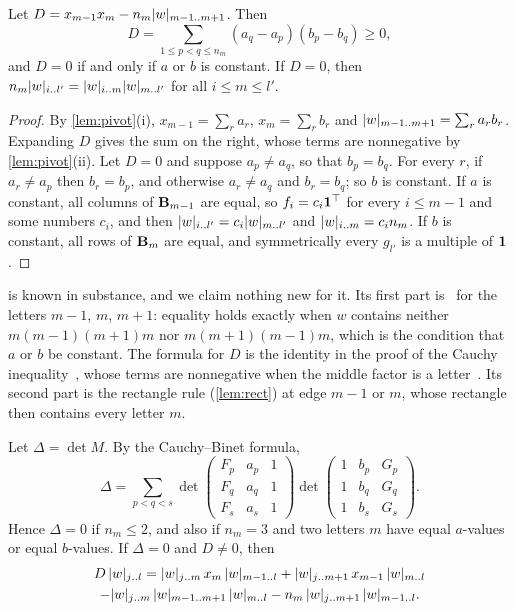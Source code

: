 \documentclass[11pt,a4paper]{article}
\begin{document}
\begin{lemma}\label{lem:letterrect}
Let $D=x_{m-1}x_m-n_m\lvert w\rvert_{m-1\mathinner{\ldotp\ldotp} m+1}$. Then
\[
D=\sum_{1\le p<q\le n_m}(a_q-a_p)(b_p-b_q)\ge0,
\]
and $D=0$ if and only if $a$ or $b$ is constant. If $D=0$, then $n_m\lvert w\rvert_{i\mathinner{\ldotp\ldotp} l'}=\lvert w\rvert_{i\mathinner{\ldotp\ldotp} m}\lvert w\rvert_{m\mathinner{\ldotp\ldotp} l'}$ for all $i\le m\le l'$.
\end{lemma}

\begin{proof}
By \cref{lem:pivot}(i), $x_{m-1}=\sum_ra_r$, $x_m=\sum_rb_r$ and $\lvert w\rvert_{m-1\mathinner{\ldotp\ldotp} m+1}=\sum_ra_rb_r$. Expanding $D$ gives the sum on the right, whose terms are nonnegative by \cref{lem:pivot}(ii). Let $D=0$ and suppose $a_p\ne a_q$, so that $b_p=b_q$. For every $r$, if $a_r\ne a_p$ then $b_r=b_p$, and otherwise $a_r\ne a_q$ and $b_r=b_q$; so $b$ is constant. If $a$ is constant, all columns of $\mathbf{B}_{m-1}$ are equal, so $f_i=c_i\mathbf{1}^{\top}$ for every $i\le m-1$ and some numbers $c_i$, and then $\lvert w\rvert_{i\mathinner{\ldotp\ldotp} l'}=c_i\lvert w\rvert_{m\mathinner{\ldotp\ldotp} l'}$ and $\lvert w\rvert_{i\mathinner{\ldotp\ldotp} m}=c_in_m$. If $b$ is constant, all rows of $\mathbf{B}_{m}$ are equal, and symmetrically every $g_{l'}$ is a multiple of $\mathbf{1}$.
\end{proof}

\begin{remark}\label{rem:letterrect}
 is known in substance, and we claim nothing new for it. Its first part is~\cite[Lemma~2, p.~12]{MSY04} for the letters $m-1$, $m$, $m+1$: equality holds exactly when $w$ contains neither $m(m-1)(m+1)m$ nor $m(m+1)(m-1)m$, which is the condition that $a$ or $b$ be constant. The formula for $D$ is the identity in the proof of the Cauchy inequality~\cite[p.~15]{MSY04}, whose terms are nonnegative when the middle factor is a letter~\cite[p.~16]{MSY04}. Its second part is the rectangle rule (\cref{lem:rect}) at edge $m-1$ or $m$, whose rectangle then contains every letter $m$.
\end{remark}

\begin{lemma}\label{lem:pminor}
Let $\Delta=\det M$. By the Cauchy--Binet formula,
\[
\Delta=\sum_{p<q<s}\det\begin{pmatrix}F_p&a_p&1\\F_q&a_q&1\\F_s&a_s&1\end{pmatrix}\det\begin{pmatrix}1&b_p&G_p\\1&b_q&G_q\\1&b_s&G_s\end{pmatrix}.
\]
Hence $\Delta=0$ if $n_m\le2$, and also if $n_m=3$ and two letters $m$ have equal $a$-values or equal $b$-values. If $\Delta=0$ and $D\ne0$, then
\begin{multline}\label{eq:rule2}
D\,\lvert w\rvert_{j\mathinner{\ldotp\ldotp} l}=\lvert w\rvert_{j\mathinner{\ldotp\ldotp} m}\,x_m\,\lvert w\rvert_{m-1\mathinner{\ldotp\ldotp} l}+\lvert w\rvert_{j\mathinner{\ldotp\ldotp} m+1}\,x_{m-1}\,\lvert w\rvert_{m\mathinner{\ldotp\ldotp} l}\\
-\lvert w\rvert_{j\mathinner{\ldotp\ldotp} m}\,\lvert w\rvert_{m-1\mathinner{\ldotp\ldotp} m+1}\,\lvert w\rvert_{m\mathinner{\ldotp\ldotp} l}-n_m\,\lvert w\rvert_{j\mathinner{\ldotp\ldotp} m+1}\,\lvert w\rvert_{m-1\mathinner{\ldotp\ldotp} l}.
\end{multline}
\end{lemma}
\end{document}
